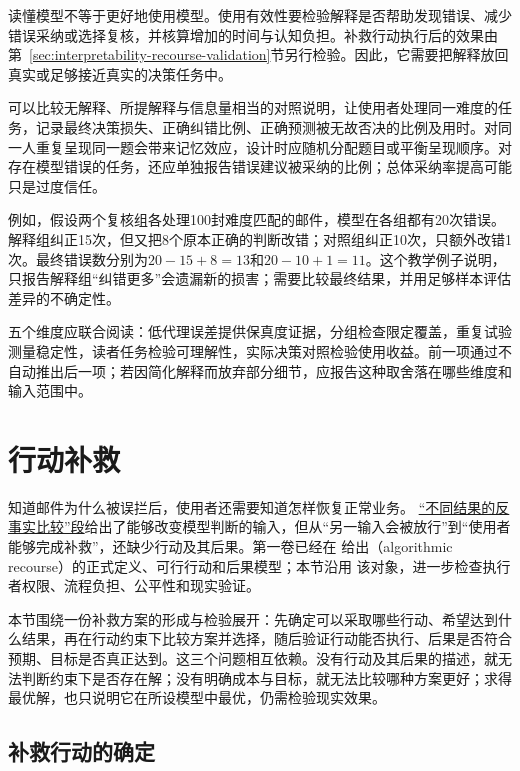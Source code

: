 读懂模型不等于更好地使用模型。使用有效性要检验解释是否帮助发现错误、减少错误采纳或选择复核，并核算增加的时间与认知负担。补救行动执行后的效果由第~\ref{sec:interpretability-recourse-validation}节另行检验。因此，它需要把解释放回真实或足够接近真实的决策任务中。

可以比较无解释、所提解释与信息量相当的对照说明，让使用者处理同一难度的任务，记录最终决策损失、正确纠错比例、正确预测被无故否决的比例及用时。对同一人重复呈现同一题会带来记忆效应，设计时应随机分配题目或平衡呈现顺序。对存在模型错误的任务，还应单独报告错误建议被采纳的比例；总体采纳率提高可能只是过度信任。

例如，假设两个复核组各处理100封难度匹配的邮件，模型在各组都有20次错误。解释组纠正15次，但又把8个原本正确的判断改错；对照组纠正10次，只额外改错1次。最终错误数分别为$20-15+8=13$和$20-10+1=11$。这个教学例子说明，只报告解释组“纠错更多”会遗漏新的损害；需要比较最终结果，并用足够样本评估差异的不确定性。

五个维度应联合阅读：低代理误差提供保真度证据，分组检查限定覆盖，重复试验测量稳定性，读者任务检验可理解性，实际决策对照检验使用收益。前一项通过不自动推出后一项；若因简化解释而放弃部分细节，应报告这种取舍落在哪些维度和输入范围中。

\section{行动补救}
\label{sec:interpretability-recourse}

知道邮件为什么被误拦后，使用者还需要知道怎样恢复正常业务。
\hyperref[sec:interpretability-local-counterfactual]{“不同结果的反事实比较”段}给出了能够改变模型判断的输入，但从“另一输入会被放行”到“使用者能够完成补救”，还缺少行动及其后果。第一卷已经在
给出（algorithmic recourse）的正式定义、可行行动和后果模型；本节沿用
该对象，进一步检查执行者权限、流程负担、公平性和现实验证。

本节围绕一份补救方案的形成与检验展开：先确定可以采取哪些行动、希望达到什么结果，再在行动约束下比较方案并选择，随后验证行动能否执行、后果是否符合预期、目标是否真正达到。这三个问题相互依赖。没有行动及其后果的描述，就无法判断约束下是否存在解；没有明确成本与目标，就无法比较哪种方案更好；求得最优解，也只说明它在所设模型中最优，仍需检验现实效果。

\subsection{补救行动的确定}
\label{sec:interpretability-recourse-target}


